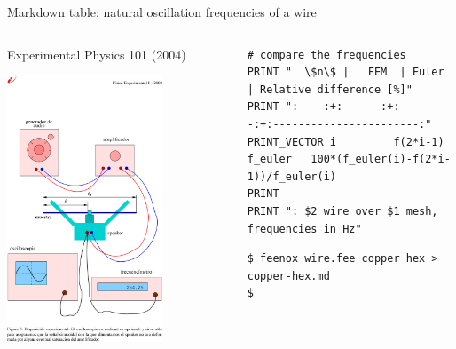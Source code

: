 \documentclass[
  ignorenonframetext,
  aspectratio=169,
]{beamer}
\begin{document}
\begin{frame}[fragile]{Markdown table: natural oscillation frequencies
of a wire}
\protect\hypertarget{markdown-table-natural-oscillation-frequencies-of-a-wire}{}
\begin{columns}[T]
\begin{column}{0.4\textwidth}
Experimental Physics 101 (2004)

\centering \includegraphics[width=0.7\textwidth,height=\textheight]{wire/alambre-3.png}
\end{column}

\begin{column}{0.6\textwidth}
\begin{lstlisting}[style=feenox]
# compare the frequencies
PRINT "  \$n\$ |   FEM  | Euler | Relative difference [%]"
PRINT ":----:+:------:+:-----:+:-----------------------:"
PRINT_VECTOR i         f(2*i-1) f_euler   100*(f_euler(i)-f(2*i-1))/f_euler(i)
PRINT
PRINT ": $2 wire over $1 mesh, frequencies in Hz"
\end{lstlisting}

\begin{lstlisting}[style=terminal]
$ feenox wire.fee copper hex > copper-hex.md
$
\end{lstlisting}


\end{column}
\end{columns}
\end{frame}
\end{document}
